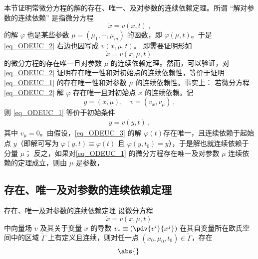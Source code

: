 
本节证明常微分方程的解的存在、唯一、及对参数的连续依赖定理。所谓 “解对参数的连续依赖” 是指微分方程
\begin{equation}\label{eq_ODEUC_2}
\dot x=v(x,t)~,
\end{equation}
 的解 $\varphi$ 也是某些参数 $\mu=(\mu_1,\cdots,\mu_m)$ 的函数，即 $\varphi(\mu,t)$。于是 \autoref{eq_ODEUC_2} 右边也因写成 $v(x,\mu,t)$。 即需要证明形如
\begin{equation}\label{eq_ODEUC_1}
\dot x=v(x,\mu,t)~
\end{equation}
的微分方程的存在唯一且对参数 $\mu$ 的连续依赖定理。然而，可以验证，对\autoref{eq_ODEUC_2} 证明存在唯一性和对初始点的连续依赖性，等价于证明\autoref{eq_ODEUC_1} 的存在唯一性和对参数 $\mu$ 的连续依赖性。事实上：
若微分方程\autoref{eq_ODEUC_2} 解 $\varphi$ 存在唯一且对初始点 $x$ 的连续依赖。记 
\begin{equation}
y=(x,\mu),\quad v=(v_x,v_{\mu})~,
\end{equation}
则 \autoref{eq_ODEUC_1} 等价于初始条件
\begin{equation}\label{eq_ODEUC_3}
\begin{aligned}
\dot y=v(y,t)~,
\end{aligned}
\end{equation}
其中 $v_{\mu}=0$。由假设，\autoref{eq_ODEUC_3} 的解 $\varphi(t)$存在唯一，且连续依赖于起始点 $y$（即解可写为 $\varphi(y,t)\equiv\varphi(t)$ 且 $\varphi(y,t_0)=y$），于是解也就连续依赖于分量 $\mu$；
反之，如果对\autoref{eq_ODEUC_1} 的微分方程存在唯一及对参数 $\mu$ 连续依赖的定理成立，则由 $\mu$ 是参数，


\subsection{存在、唯一及对参数的连续依赖定理}
\begin{theorem}{存在、唯一及对参数的连续依赖定理}
设微分方程
\begin{equation}
\dot x=v(x,\mu,t)~
\end{equation}
中向量场 $v$ 及其关于变量 $x$ 的导数 $v_*\equiv(\pdv{v^i}{x^j})$ 在其自变量所在欧氏空间中的区域 $\tilde\Gamma$ 上有定义且连续，则对任一点 $(x_0,\mu_0,t_0)\in\tilde\Gamma$，存在
\begin{equation}
\abs{}~
\end{equation}

\end{theorem}
